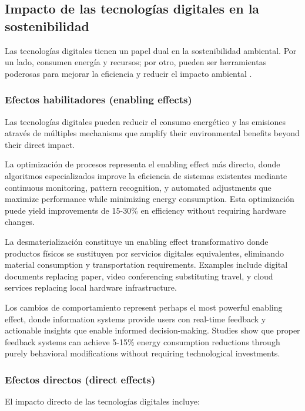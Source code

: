 \subsection{Impacto de las tecnologías digitales en la sostenibilidad}

Las tecnologías digitales tienen un papel dual en la sostenibilidad ambiental. Por un lado, consumen energía y recursos; por otro, pueden ser herramientas poderosas para mejorar la eficiencia y reducir el impacto ambiental \cite{lange2020digitalization}.

\subsubsection{Efectos habilitadores (enabling effects)}

Las tecnologías digitales pueden reducir el consumo energético y las emisiones através de múltiples mechanisms que amplify their environmental benefits beyond their direct impact.

La optimización de procesos representa el enabling effect más directo, donde algoritmos especializados improve la eficiencia de sistemas existentes mediante continuous monitoring, pattern recognition, y automated adjustments que maximize performance while minimizing energy consumption. Esta optimización puede yield improvements de 15-30\% en efficiency without requiring hardware changes.

La desmaterialización constituye un enabling effect transformativo donde productos físicos se sustituyen por servicios digitales equivalentes, eliminando material consumption y transportation requirements. Examples include digital documents replacing paper, video conferencing substituting travel, y cloud services replacing local hardware infrastructure.

Los cambios de comportamiento represent perhaps el most powerful enabling effect, donde information systems provide users con real-time feedback y actionable insights que enable informed decision-making. Studies show que proper feedback systems can achieve 5-15\% energy consumption reductions through purely behavioral modifications without requiring technological investments.

\subsubsection{Efectos directos (direct effects)}

El impacto directo de las tecnologías digitales incluye:

